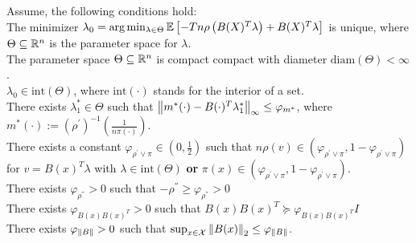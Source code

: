 \begin{asu}
  \label{assumption_1}
  Assume, the following conditions hold:
\\
  \subasu 
    \label{assumption_1_i} 
    The minimizer 
    $
    \lambda_0 
    =
    \arg \min_{\lambda \in \Theta}
    \mathbb{E}
    \left[ 
      -T n 
      \rho 
      \left( 
      B(X)^T \lambda
      \right)
      +
      B(X)^T \lambda
    \right]
    $
    is unique,
    where 
    $\Theta \subseteq \mathbb{R}^n$ is the parameter space for $\lambda$.
\\ %
  \subasu 
    \label{assumption_1_ii} 
    The parameter space 
    $\Theta \subseteq \mathbb{R}^n$
    is compact compact with diameter
    $\text{diam}(\Theta) < \infty$.
\\ %
  \subasu 
    \label{assumption_1_iii}
    $\lambda_0 \in \text{int}(\Theta)$,
    where
    $\text{int}(\cdot)$
    stands for the interior of a set.
\\ %
  \subasu
    \label{assumption_1_iv}
    There exists
    $\lambda^*_1 \in \Theta$
    such that
    $
      \left\lVert
        m^*(\cdot)
        -
        B(\cdot)^T \lambda^*_1
      \right\rVert_\infty
      \le 
      \varphi_{m^*}
    $,
    where
    $
      m^*(\cdot)
      :=
      \left( \rho^{'} \right)^{-1}
      \left( \frac{1}{n \pi(\cdot)} \right).
    $
\\ %
  \subasu
    \label{assumption_1_v}
    There exists a constant 
    $
      \varphi_{\rho^{'} \lor \pi} 
      \in 
      \left(0, \frac{1}{2} \right)
    $
    such that
    $
      n\rho(v) 
      \in 
      (
      \varphi_{\rho^{'} \lor \pi},
      1 - \varphi_{\rho^{'} \lor \pi}
      )
    $
    for $v=B(x)^T \lambda$ with $\lambda \in \text{int}(\Theta)$ 
    \textbf{or}
    $
      \pi(x)
      \in 
      (
      \varphi_{\rho^{'} \lor \pi},
      1 - \varphi_{\rho^{'} \lor \pi}
      )
    $.
\\ %
  \subasu
    \label{assumption_1_vi}
    There exists 
    $ \varphi_{\rho^{''}} > 0 $
    such that
    $ -\rho^{''} \ge \varphi_{\rho^{''}} > 0 $
\\ %
  \subasu
    \label{assumption_1_vii}
    There exists 
    $ \varphi_{B(x) B(x)^T} > 0 $ 
    such that
    $
      B(x) B(x)^T 
      \succcurlyeq 
      \varphi_{B(x) B(x)^T} I 
    $
\\ %
  \subasu
    \label{assumption_1_viii}
    There exists
    $ \varphi_{\left\lVert B\right\rVert} > 0 $
    such that
    $
      \sup_{x \in \mathcal{X}} \left\lVert B(x)\right\rVert_2
      \le 
      \varphi_{\left\lVert B\right\rVert}
    $.
\end{asu}

